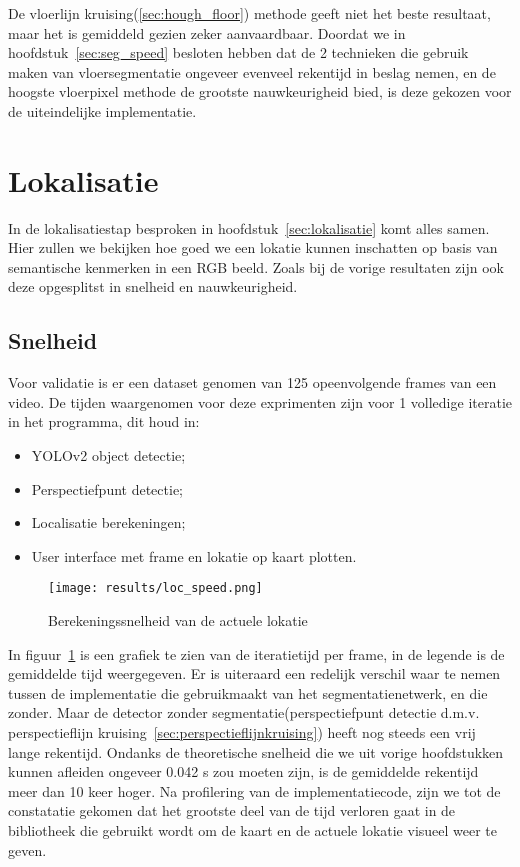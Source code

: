 De vloerlijn kruising(\ref{sec:hough_floor}) methode geeft niet het beste resultaat, maar het is gemiddeld gezien zeker aanvaardbaar.
Doordat we in hoofdstuk~\ref{sec:seg_speed} besloten hebben dat de 2 technieken die gebruik maken van vloersegmentatie ongeveer evenveel rekentijd in beslag
nemen, en de hoogste vloerpixel methode de grootste nauwkeurigheid bied, is deze gekozen voor de uiteindelijke implementatie.

\section{Lokalisatie}

In de lokalisatiestap besproken in hoofdstuk~\ref{sec:lokalisatie} komt alles samen.
Hier zullen we bekijken hoe goed we een lokatie kunnen inschatten op basis van semantische kenmerken in een \gls{RGB} beeld.
Zoals bij de vorige resultaten zijn ook deze opgesplitst in snelheid en nauwkeurigheid.


\subsection{Snelheid}
Voor validatie is er een dataset genomen van 125 opeenvolgende frames van een video.
De tijden waargenomen voor deze exprimenten zijn voor 1 volledige iteratie in het programma, dit houd in:

\begin{itemize}
    \item YOLOv2 object detectie;
    \item Perspectiefpunt detectie;
    \item Localisatie berekeningen;
    \item User interface met frame en lokatie op kaart plotten.
\end{itemize}

\begin{figure}[h]
    \centering
    \texttt{[image: results/loc\_speed.png]}
    \caption{Berekeningssnelheid van de actuele lokatie}
    \label{fig:loc_speed}
\end{figure}

In figuur~\ref{fig:loc_speed} is een grafiek te zien van de iteratietijd per frame, in de legende is de gemiddelde tijd weergegeven.
Er is uiteraard een redelijk verschil waar te nemen tussen de implementatie die gebruikmaakt van het segmentatienetwerk, en die zonder.
Maar de detector zonder segmentatie(perspectiefpunt detectie d.m.v. perspectieflijn kruising~\ref{sec:perspectieflijnkruising}) heeft nog steeds
een vrij lange rekentijd.
Ondanks de theoretische snelheid die we uit vorige hoofdstukken kunnen afleiden ongeveer 0.042 s zou moeten zijn, is de gemiddelde rekentijd meer dan 10 keer hoger.
Na profilering van de implementatiecode, zijn we tot de constatatie gekomen dat het grootste deel van de tijd verloren gaat in de bibliotheek die gebruikt wordt
om de kaart en de actuele lokatie visueel weer te geven.


